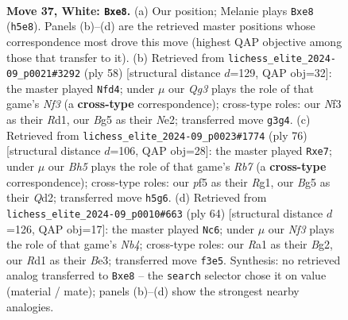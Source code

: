 \documentclass[11pt]{article}
\begin{document}
\clearpage

\begin{figure}[p]\centering
\begin{subfigure}{0.46\textwidth}\centering
\resizebox{\linewidth}{!}{%
\newchessgame
\chessboard[
  setfen={r1b1rk2/3p2bp/1q2p3/p4pBB/P1np3P/5NQ1/1P3PK1/RN1R4 w - - 4 37},
  showmover=false,
  pgfstyle=straightmove, color=movearrow, markmove={h5-e8}
]}
\caption{}
\end{subfigure}\hfill
\begin{subfigure}{0.46\textwidth}\centering
\resizebox{\linewidth}{!}{%
\newchessgame
\chessboard[
  setfen={2r3k1/1b5p/1p3qp1/1Bbp1p2/Pp2n3/1P1Q1N2/4NPPP/3R2K1 w - - 8 30},
  showmover=false,
  pgfstyle=straightmove, color=movearrow, markmove={f3-d4}
]}
\caption{}
\end{subfigure}
\\[4pt]
\begin{subfigure}{0.46\textwidth}\centering
\resizebox{\linewidth}{!}{%
\newchessgame
\chessboard[
  setfen={3r3k/1R2rqbp/pN1p2p1/Pb1Pp2n/1P6/4B2P/3Q1PPN/6RK w - - 1 39},
  showmover=false,
  pgfstyle=straightmove, color=movearrow, markmove={b7-e7}
]}
\caption{}
\end{subfigure}\hfill
\begin{subfigure}{0.46\textwidth}\centering
\resizebox{\linewidth}{!}{%
\newchessgame
\chessboard[
  setfen={1n2r1k1/6p1/p2q3p/1p1Pbp2/1N1Rp1b1/PN2B3/1P3PB1/2Q3K1 w - - 2 33},
  showmover=false,
  pgfstyle=straightmove, color=movearrow, markmove={b4-c6}
]}
\caption{}
\end{subfigure}
\caption{\textbf{Move 37, White: \texttt{Bxe8}.} (a) Our position; Melanie plays \texttt{Bxe8} (\texttt{h5e8}). Panels (b)--(d) are the retrieved master positions whose correspondence most drove this move (highest QAP objective among those that transfer to it). (b) Retrieved from \texttt{lichess\_elite\_2024-09\_p0021\#3292} (ply 58) [structural distance $d$=129, QAP obj=32]: the master played \texttt{Nfd4}; under $\mu$ our \emph{Qg3} plays the role of that game's \emph{Nf3} (a \textbf{cross-type} correspondence); cross-type roles: our \emph{N}f3 as their \emph{R}d1, our \emph{B}g5 as their \emph{N}e2; transferred move \texttt{g3g4}. (c) Retrieved from \texttt{lichess\_elite\_2024-09\_p0023\#1774} (ply 76) [structural distance $d$=106, QAP obj=28]: the master played \texttt{Rxe7}; under $\mu$ our \emph{Bh5} plays the role of that game's \emph{Rb7} (a \textbf{cross-type} correspondence); cross-type roles: our \emph{p}f5 as their \emph{R}g1, our \emph{B}g5 as their \emph{Q}d2; transferred move \texttt{h5g6}. (d) Retrieved from \texttt{lichess\_elite\_2024-09\_p0010\#663} (ply 64) [structural distance $d$=126, QAP obj=17]: the master played \texttt{Nc6}; under $\mu$ our \emph{Nf3} plays the role of that game's \emph{Nb4}; cross-type roles: our \emph{R}a1 as their \emph{B}g2, our \emph{R}d1 as their \emph{B}e3; transferred move \texttt{f3e5}. Synthesis: no retrieved analog transferred to \texttt{Bxe8} -- the \texttt{search} selector chose it on value (material / mate); panels (b)--(d) show the strongest nearby analogies.}
\label{fig:thought-m72}
\end{figure}
\end{document}
